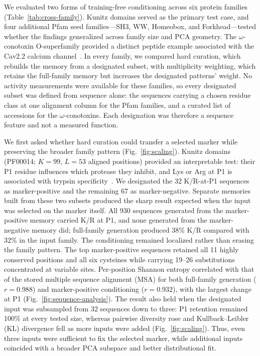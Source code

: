 
We evaluated two forms of training-free conditioning across six protein families
(Table~\ref{tab:cross-family}). Kunitz domains served as the primary test case, and four
additional Pfam seed families---SH3, WW, Homeobox, and Forkhead---tested whether the findings
generalized across family size and PCA geometry. The $\omega$-conotoxin O-superfamily provided
a distinct peptide example associated with the Cav2.2 calcium
channel~\cite{omegaConotoxinSAR2006}. In every family, we
compared hard curation, which rebuilds the memory from a designated subset, with multiplicity
weighting, which retains the full-family memory but increases the designated patterns' weight.
No activity measurements were available for these families, so every designated subset was
defined from sequence alone: the sequences carrying a chosen residue class at one alignment
column for the Pfam families, and a curated list of accessions for the $\omega$-conotoxins.
Each designation was therefore a sequence feature and not a measured function.

We first asked whether hard curation could transfer a selected marker while preserving the
broader family pattern (Fig.~\ref{fig:scaling}). Kunitz domains (PF00014; $K=99$, $L=53$ aligned positions) provided an
interpretable test: their P1 residue influences which protease they inhibit, and Lys or Arg at
P1 is associated with trypsin specificity~\cite{laskowskiProteinInhibitors1980}. We designated the
32 K/R-at-P1 sequences as marker-positive and the remaining 67 as marker-negative.
Separate memories built from these two subsets produced the sharp result expected when the
input was selected on the marker itself. All 930 sequences generated from the marker-positive
memory carried K/R at P1, and none generated from the marker-negative memory did; full-family
generation produced 38\% K/R compared with 32\% in the input family. The conditioning remained
localized rather than erasing the family pattern. The top marker-positive sequences retained
all 11 highly conserved positions and all six cysteines
while carrying 19--26 substitutions concentrated at variable sites. Per-position Shannon
entropy correlated with that of the stored multiple sequence alignment (MSA) for both full-family
generation ($r=0.988$) and marker-positive conditioning ($r=0.932$), with the largest change
at P1 (Fig.~\ref{fig:sequence-analysis}). The result also held when the designated input was
subsampled from 32 sequences down to three: P1 retention remained 100\% at every tested size,
whereas pairwise diversity rose and Kullback--Leibler (KL) divergence fell as more inputs were
added (Fig.~\ref{fig:scaling}). Thus, even three inputs were sufficient to fix the selected
marker, while additional inputs coincided with a broader PCA subspace and better distributional fit.

